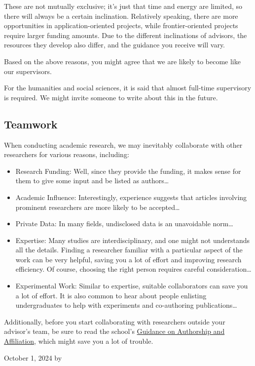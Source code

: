 \vspace{\baselineskip}

These are not mutually exclusive; it’s just that time and energy are limited, so there will always be a certain inclination. Relatively speaking, there are more opportunities in application-oriented projects, while frontier-oriented projects require larger funding amounts. Due to the different inclinations of advisors, the resources they develop also differ, and the guidance you receive will vary.

Based on the above reasons, you might agree that we are likely to become like our supervisors.

For the humanities and social sciences, it is said that almost full-time supervisory is required. We might invite someone to write about this in the future.

\subsection{Teamwork}
\label{subsection.teamwork}
When conducting academic research, we may inevitably collaborate with other researchers for various reasons, including:
\begin{itemize}
    \item Research Funding: Well, since they provide the funding, it makes sense for them to give some input and be listed as authors\dots
    \item Academic Influence: Interestingly, experience suggests that articles involving prominent researchers are more likely to be accepted\dots
    \item Private Data: In many fields, undisclosed data is an unavoidable norm\dots
    \item Expertise: Many studies are interdisciplinary, and one might not understands all the details. Finding a researcher familiar with a particular aspect of the work can be very helpful, saving you a lot of effort and improving research efficiency. Of course, choosing the right person requires careful consideration\dots
    \item Experimental Work: Similar to expertise, suitable collaborators can save you a lot of effort. It is also common to hear about people enlisting undergraduates to help with experiments and co-authoring publications\dots
\end{itemize}

\vspace{\baselineskip}

Additionally, before you start collaborating with researchers outside your advisor’s team, be sure to read the school’s \href{https://ebridge.xjtlu.edu.cn/urd/sits.urd/run/SIW_FILE_LOAD.start_url?08F2CBCAE3174A7365Px9_5kBfG0_iGiWj8zb7ybwaO0YBYc8NiKlPG93xyQA9X2SClXOLLd7-_EgF50aijROwT-rdSGIUIbRRzhFu-76Ha0g2HymUr0S-Fgjm1DXP9RO1GhGzx5-akgsDSMBlNhR7vpib85F9vlqa67My7RKHFSiluZueFy52YCBtintt0wDTKmx4fCjkWnldNDaxo6ZVD2L572Us3V-FOv485wYZUNUn5NLzgR0pAaU7aiKnTVJY8Aa2su5F4u7o-rNPJPety3jwwJ4O1v1agpDZLZ1it1H5fWn3IgLNaWlUh84YpxNRXyTW1kIwrX0r4-dT1eoxdZUAFrJhaBwz6E0w}{Guidance on Authorship and Affiliation}, which might save you a lot of trouble.

\begin{flushright}
    October 1, 2024 by \Shiyao \\
\end{flushright}